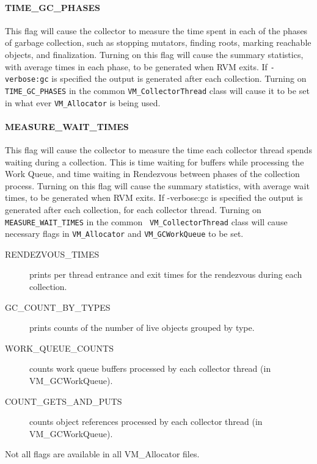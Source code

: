 \paragraph{TIME\_GC\_PHASES}
This flag will cause the collector to measure the time spent in each
of the phases of garbage collection, such as stopping mutators, finding roots,
marking reachable objects, and finalization.  Turning on this flag will cause
the summary statistics, with average times in each phase, to be generated 
when RVM exits.  If {\tt -verbose:gc} is specified the output is generated after
each collection. Turning on {\tt TIME\_GC\_PHASES} in the common 
{\tt VM\_CollectorThread}
class will cause it to be set in what ever 
{\tt VM\_Allocator} is being used.

\paragraph{MEASURE\_WAIT\_TIMES}
This flag will cause the collector to measure the time each collector thread
spends waiting during a collection.  This is time waiting for buffers while
processing the Work Queue, and time waiting in Rendezvous between phases of the
collection process. Turning on this flag will cause
the summary statistics, with average wait times, to be generated 
when RVM exits.  If -verbose:gc is specified the output is generated after
each collection, for each collector thread.
Turning on {\tt MEASURE\_WAIT\_TIMES} in the common {\tt
VM\_CollectorThread}
class will cause necessary flags in {\tt VM\_Allocator} and 
{\tt VM\_GCWorkQueue} to be set.

\begin{description}
\item[RENDEZVOUS\_TIMES] prints per thread entrance and exit times for the
rendezvous during each collection.
\item[GC\_COUNT\_BY\_TYPES] prints counts of the number of live objects grouped
by type.
\item[WORK\_QUEUE\_COUNTS] counts work queue buffers processed by each collector
thread (in VM\_GCWorkQueue). 
\item[COUNT\_GETS\_AND\_PUTS] counts object references processed by each collector
thread (in VM\_GCWorkQueue). 
\end{description}
Not all flags are available in all VM\_Allocator files.
